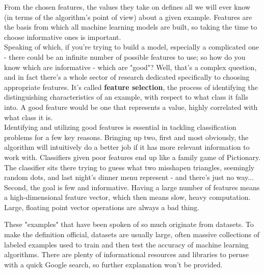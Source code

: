\documentclass[12pt,letterpaper]{article}
\begin{document}
			From the chosen features, the values they take on defines all we will ever know (in terms of the algorithm's point of view) about a given example. Features are the basis from which all machine learning models are built, so taking the time to choose informative ones is important.\\ 
			
			Speaking of which, if you're trying to build a model, especially a complicated one - there could be an infinite number of possible features to use; so how do you know which are informative - which are "good"? Well, that's a complex question, and in fact there's a whole sector of research dedicated specifically to choosing appropriate features. 
			It's called \textbf{feature selection}, the process of identifying the distinguishing characteristics of an example, with respect to what class it falls into. A good feature would be one that represents a value, highly correlated with what class it is.\\
			Identifying and utilizing good features is essential in tackling classification problems for a few key reasons. Bringing up two, first and most obviously, the algorithm will intuitively do a better job if it has more relevant information to work with. Classifiers given poor features end up like a family game of Pictionary. The classifier sits there trying to guess what two misshapen triangles, seemingly random dots, and last night's dinner menu represent - and there's just no way... Second, the goal is few and informative. Having a large number of features means a high-dimensional feature vector, which then means slow, heavy computation. Large, floating point vector operations are always a bad thing. 
			
			These "examples" that have been spoken of so much originate from datasets. To make the definition official, datasets are usually large, often massive collections of labeled examples used to train and then test the accuracy of machine learning algorithms. There are plenty of informational resources and libraries to peruse with a quick Google search, so further explanation won't be provided.
\end{document}
